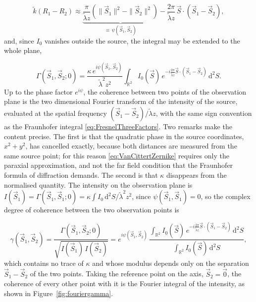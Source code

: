 		\begin{equation}
			\tilde{k}\left(R_{1}-R_{2}\right) \approx \underbrace{\frac{\pi}{\tilde{\lambda}z}\left(\|\vec{S}_{1}\|^{2}-\|\vec{S}_{2}\|^{2}\right)}_{\equiv\,\psi(\vec{S}_{1},\vec{S}_{2})}-\frac{2\pi}{\tilde{\lambda}z}\,\vec{S}\cdot\left(\vec{S}_{1}-\vec{S}_{2}\right),
		\end{equation}
		and, since $I_{0}$ vanishes outside the source, the integral may be extended to the whole
		plane,

		\begin{equation}\label{eq:VanCittertZernike}
			\boxed{\Gamma(\vec{S}_{1},\vec{S}_{2};0) = \frac{\kappa\,e^{i\psi(\vec{S}_{1},\vec{S}_{2})}}{\tilde{\lambda}^{2}z^{2}}\int_{\mathbb{R}^{2}}I_{0}(\vec{S})\,e^{-i\frac{2\pi}{\tilde{\lambda}z}\vec{S}\cdot\left(\vec{S}_{1}-\vec{S}_{2}\right)}\,\mathrm{d}^{2}S }.
		\end{equation}
		Up to the phase factor $e^{i\psi}$, the coherence between two points of the observation
		plane is the two dimensional Fourier transform of the intensity of the source, evaluated
		at the spatial frequency $(\vec{S}_{1}-\vec{S}_{2})/\tilde{\lambda}z$, with the same sign
		convention as the Fraunhofer integral \eqref{eq:FresnelThreeFactors}. Two remarks make
		the content precise. The first is that the quadratic phase in the source coordinates,
		$x^{2}+y^{2}$, has cancelled exactly, because both distances are measured from the same
		source point; for this reason \eqref{eq:VanCittertZernike} requires only the paraxial
		approximation, and not the far field condition that the Fraunhofer formula of diffraction
		demands. The second is that $\kappa$ disappears from the normalised quantity. The
		intensity on the observation plane is
		$I(\vec{S}_{1})=\Gamma(\vec{S}_{1},\vec{S}_{1};0)=\kappa\int I_{0}\,\mathrm{d}^{2}S/\tilde{\lambda}^{2}z^{2}$,
		since $\psi(\vec{S}_{1},\vec{S}_{1})=0$, so the complex degree of coherence between the
		two observation points is

		\begin{equation}\label{eq:VCZdegree}
			\gamma(\vec{S}_{1},\vec{S}_{2}) = \frac{\Gamma(\vec{S}_{1},\vec{S}_{2};0)}{\sqrt{I(\vec{S}_{1})\,I(\vec{S}_{2})}}
			= e^{i\psi(\vec{S}_{1},\vec{S}_{2})}\,\frac{\displaystyle\int_{\mathbb{R}^{2}}I_{0}(\vec{S})\,e^{-i\frac{2\pi}{\tilde{\lambda}z}\vec{S}\cdot\left(\vec{S}_{1}-\vec{S}_{2}\right)}\,\mathrm{d}^{2}S}{\displaystyle\int_{\mathbb{R}^{2}}I_{0}(\vec{S})\,\mathrm{d}^{2}S},
		\end{equation}
		which contains no trace of $\kappa$ and whose modulus depends only on the separation
		$\vec{S}_{1}-\vec{S}_{2}$ of the two points. Taking the reference point on the axis,
		$\vec{S}_{2}=\vec{0}$, the coherence of every other point with it is the Fourier
		integral of the intensity, as shown in Figure~\ref{fig:fouriergamma}.

